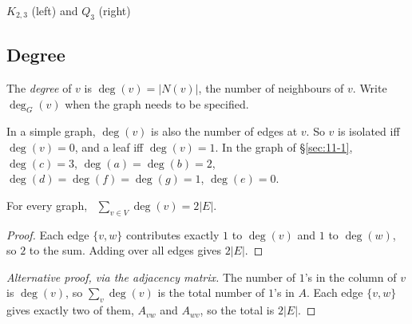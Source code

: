 \begin{center}
\qquad
{}
\end{center}
\begin{center}
\small $K_{2,3}$ (left) and $Q_3$ (right)
\end{center}

\subsection{Degree}
\label{sec:11-7}

\begin{definition}[Degree]
\label{def:degree}
The \emph{degree} of $v$ is $\deg(v) = |N(v)|$, the number of neighbours of $v$. Write $\deg_G(v)$ when the graph needs to be specified.
\end{definition}

\begin{note}
In a simple graph, $\deg(v)$ is also the number of edges at $v$. So $v$ is isolated iff $\deg(v)=0$, and a leaf iff $\deg(v)=1$. In the graph of \S\ref{sec:11-1}, $\deg(c)=3$, $\deg(a)=\deg(b)=2$, $\deg(d)=\deg(f)=\deg(g)=1$, $\deg(e)=0$.
\end{note}

\begin{theorem}
\label{thm:handshake}
For every graph, \ $\displaystyle\sum_{v\in V} \deg(v) = 2|E|$.
\end{theorem}
\begin{proof}
Each edge $\{v,w\}$ contributes exactly $1$ to $\deg(v)$ and $1$ to $\deg(w)$, so $2$ to the sum. Adding over all edges gives $2|E|$.
\end{proof}
\begin{proof}[Alternative proof, via the adjacency matrix]
The number of $1$'s in the column of $v$ is $\deg(v)$, so $\sum_v\deg(v)$ is the total number of $1$'s in $A$. Each edge $\{v,w\}$ gives exactly two of them, $A_{vw}$ and $A_{wv}$, so the total is $2|E|$.
\end{proof}

